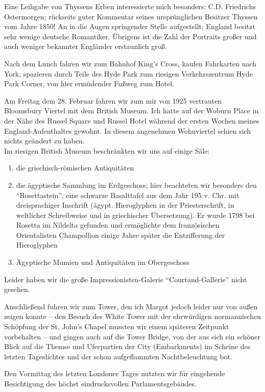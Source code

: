 Eine Leihgabe von Thyssens Erben interessierte mich besonders: C.D. Friedrichs Ostermorgen; rückseits guter Kommentar seines ursprünglichen Besitzer Thyssen vom Jahre 1850! An in die Augen springender Stelle aufgestellt; England besitzt sehr wenige deutsche Romantiker. Übrigens ist die Zahl der Portraits großer und auch weniger bekannter Engländer erstaunlich groß.

Nach dem Lunch fahren wir zum Bahnhof King's Cross, kaufen Fahrkarten nach York, spazieren durch Teile des Hyde Park zum riesigen Verkehrszentrum Hyde Park Corner, von hier ermüdender Fußweg zum Hotel.

Am Freitag dem 28. Februar fahren wir zum mir von 1925 vertrauten Bloomsbury Viertel mit dem British Museum. Ich hatte auf der Woburn Place in der Nähe des Russel Square und Russel Hotel während der ersten Wochen meines England-Aufenthaltes gewohnt. In diesem angenehmen Wohnviertel schien sich nichts geändert zu haben.\\

Im riesigen British Museum beschränkten wir uns auf einige Säle:
\begin{enumerate}
	\item die griechisch-römischen Antiquitäten 
	\item die ägyptische Sammlung im Erdgeschoss; hier beachteten wir besonders den \enquote{Rosettastein}, eine schwarze Basalttafel aus dem Jahr 195 v. Chr. mit dreisprachiger Inschrift (ägypt. Hieroglyphen in der Priesterschrift, in weltlicher Schreibweise und in griechischer Übersetzung). Er wurde 1798 bei Rosetta im Nildelta gefunden und ermöglichte dem französischen Orientalisten Champollion einige Jahre später die Entzifferung der Hieroglyphen
	\item Ägyptische Mumien und Antiquitäten im Obergeschoss
\end{enumerate}

Leider haben wir die große Impressionisten-Galerie \enquote{Courtand-Gallerie} nicht gesehen.

Anschließend fuhren wir zum Tower, den ich Margot jedoch leider nur von außen zeigen konnte -- den Besuch des White Tower mit der ehrwürdigen normannischen Schöpfung der St. John's Chapel mussten wir einem späteren Zeitpunkt vorbehalten -- und gingen auch auf die Tower Bridge, von der aus sich ein schöner Blick auf die Themse und Uferpartien der City (Embarkments) im Scheine des letzten Tageslichtes und der schon aufgeflammten Nachtbeleuchtung bot.

Den Vormittag des letzten Londoner Tages nutzten wir für eingehende Besichtigung des höchst eindrucksvollen Parlamentsgebäudes.

